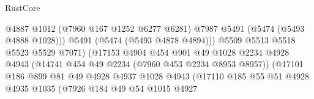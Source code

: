 \begin{lexlean}{RustCore}
\begin{coremodule}
                                                  @4887
                                                  @1012
                                                  (@7960 @167 @1252 @6277 @6281)
                                                  @7987
                                                  @5491
                                                  (@5474 (@5493 @4888 @1028)))
                                                @5491
                                                (@5474 (@5493 @4878 @4894)))
                                              @5509
                                              @5513
                                              @5518
                                              @5523
                                              @5529
                                              @7071)
                                            (@17153
                                              @4904
                                              @454
                                              @901
                                              @49
                                              @1028
                                              @2234
                                              @4928
                                              @4943
                                              (@14741 @454 @49 @2234 (@7960 @453 @2234 @8953 @8957))
                                              (@17101
                                                @186
                                                @899
                                                @81
                                                @49
                                                @4928
                                                @4937
                                                @1028
                                                @4943
                                                (@17110
                                                  @185
                                                  @55
                                                  @51
                                                  @4928
                                                  @4935
                                                  @1035
                                                  (@7926
                                                    @184
                                                    @49
                                                    @54
                                                    @1015
                                                    @4927

\end{coremodule}
\end{lexlean}
